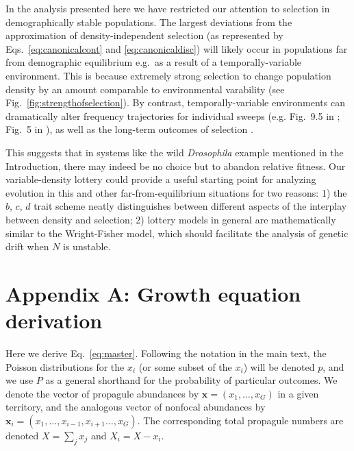 \documentclass[12pt]{article}
\begin{document}
In the analysis presented here we have restricted our attention to selection in demographically stable populations. The largest deviations from the approximation of density-independent selection (as represented by Eqs.~\eqref{eq:canonicalcont} and \eqref{eq:canonicaldisc}) will likely occur in populations far from demographic equilibrium e.g.~as a result of a temporally-variable environment. This is because extremely strong selection to change population density by an amount comparable to environmental varability (see Fig.~\ref{fig:strengthofselection}). By contrast, temporally-variable environments can dramatically alter frequency trajectories for individual sweeps (e.g. Fig.~9.5 in \cite{otto_2011}; Fig.~5 in \cite{mallet_2012}), as well as the long-term outcomes of selection \citep{lande_2009}. 

This suggests that in systems like the wild \textit{Drosophila} example mentioned in the Introduction, there may indeed be no choice but to abandon relative fitness. Our variable-density lottery could provide a useful starting point for analyzing evolution in this and other far-from-equilibrium situations for two reasons: 1) the $b$, $c$, $d$ trait scheme neatly distinguishes between different aspects of the interplay between density and selection; 2) lottery models in general are mathematically similar to the Wright-Fisher model, which should facilitate the analysis of genetic drift when $N$ is unstable.


 

\section*{Appendix A: Growth equation derivation}

Here we derive Eq.~\eqref{eq:master}. Following the notation in the main text, the Poisson distributions for the $x_i$ (or some subset of the $x_i$) will be denoted $p$, and we use $P$ as a general shorthand for the probability of particular outcomes. We denote the vector of propagule abundances by ${\mathbf x} = (x_1,\ldots,x_G)$ in a given territory, and the analogous vector of nonfocal abundances by ${\mathbf x_i}=(x_1,\ldots,x_{i-1},x_{i+1}\ldots,x_G)$. The corresponding total propagule numbers are denoted $X=\sum_j x_j$ and $X_i=X-x_i$.
\end{document}
